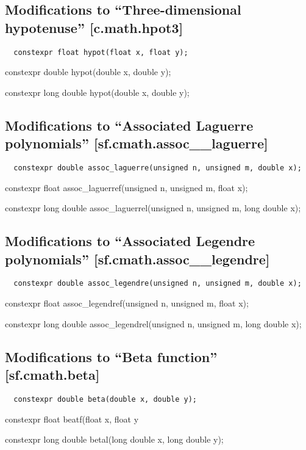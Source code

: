 \documentclass[prd,twocolumn,amsmath,amssymb,nofootinbib,eqsecnum]{revtex4-1}
\newcommand{\code}[1]{{\tt #1}}
\newcommand{\highlight}[1]{{\color{red} #1}}
\begin{document}
\subsection{Modifications to ``Three-dimensional hypotenuse''  [c.math.hpot3]}

\code{
	\highlight{constexpr} float hypot(float x, float y); 

	\highlight{constexpr} double hypot(double x, double y);

	\highlight{constexpr} long double hypot(double x, double y); 
}

\subsection{Modifications to  ``Associated Laguerre polynomials''  [sf.cmath.assoc\_\_laguerre]}

\code{
	\highlight{constexpr} double assoc\_laguerre(unsigned n, unsigned m, double x);
	
	\highlight{constexpr} float assoc\_laguerref(unsigned n, unsigned m, float x);
	
	\highlight{constexpr} long double assoc\_laguerrel(unsigned n, unsigned m, long double x);

}

\subsection{Modifications to  ``Associated Legendre polynomials''  [sf.cmath.assoc\_\_legendre]}

\code{
	\highlight{constexpr} double assoc\_legendre(unsigned n, unsigned m, double x);
	
	\highlight{constexpr} float assoc\_legendref(unsigned n, unsigned m, float x);
	
	\highlight{constexpr} long double assoc\_legendrel(unsigned n, unsigned m, long double x);

}

\subsection{Modifications to  ``Beta function''  [sf.cmath.beta]}

\code{
	\highlight{constexpr} double beta(double x, double y);
	
	\highlight{constexpr} float beatf(float x, float y
	
	\highlight{constexpr} long double betal(long double x, long double y);
	
}
\end{document}
